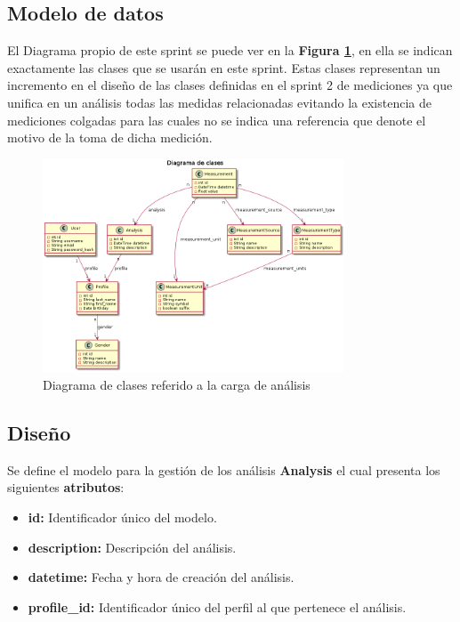 \documentclass[a4paper,12pt]{article}
\begin{document}
\subsection{Modelo de datos}
El Diagrama propio de este sprint se puede ver en la \textbf{Figura \ref{5-diagramaClases}}, en ella se indican exactamente las clases que se usarán en este sprint. Estas clases representan un incremento en el diseño de las clases definidas en el sprint 2 de mediciones ya que unifica en un análisis todas las medidas relacionadas evitando la existencia de mediciones colgadas para las cuales no se indica una referencia que denote el motivo de la toma de dicha medición.

    \begin{figure}[h]
        \centering
        \includegraphics[width=0.8\textwidth]{img/sprint5_dc}
        \caption{Diagrama de clases referido a la carga de análisis}
		\label{5-diagramaClases}
    \end{figure}

\clearpage

\subsection{Diseño}

	Se define el modelo para la gestión de los análisis \textbf{Analysis} el cual presenta los siguientes \textbf{atributos}:

\begin{itemize}
	\item \textbf{id:} Identificador único del modelo.
	\item \textbf{description:} Descripción del análisis.
	\item \textbf{datetime: }	Fecha y hora de creación del análisis.	
	\item \textbf{profile\_id: } Identificador único del perfil al que pertenece el análisis.
\end{itemize}
\end{document}
